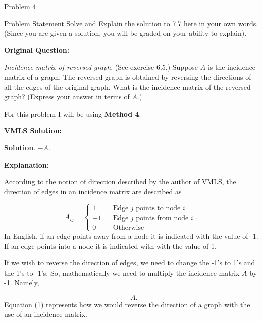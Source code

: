 \begin{problem}{Problem 4}
    \begin{statement}{Problem Statement}
        Solve and Explain the solution to 7.7 here in your own words. (Since you are given a solution, you will be graded on your ability to explain). \vspace*{1em}

        \noindent \textbf{Original Question:} \vspace*{1em}

        \textit{Incidence matrix of reversed graph}. (See exercise 6.5.) Suppose $A$ is the incidence matrix of a graph. The reversed graph is obtained by reversing the directions of all the edges of the 
        original graph. What is the incidence matrix of the reversed graph? (Express your answer in terms of $A$.)
    \end{statement}

    \begin{Highlight}[Solution]
        For this problem I will be using \textbf{Method 4}. \vspace*{1em}

        \noindent \textbf{VMLS Solution:} \vspace*{1em}

        \textbf{Solution}. $-A$. \vspace*{1em}

        \noindent \textbf{Explanation:} \vspace*{1em}

        According to the notion of direction described by the author of VMLS, the direction of edges in an incidence matrix are described as

        \begin{equation*}
            A_{ij} = \left\{
                \begin{aligned}
                    1 & & \text{Edge $j$ points to node $i$} \\
                    -1 & & \text{Edge $j$ points from node $i$} \\
                    0 & & \text{Otherwise}
                \end{aligned}
            \right. .
        \end{equation*}
        In English, if an edge points away from a node it is indicated with the value of -1. If an edge points into a node it is indicated with with the value of 1.

        If we wish to reverse the direction of edges, we need to change the -1's to 1's and the 1's to -1's. So, mathematically we need to multiply the incidence matrix $A$ by -1. Namely,

        \setcounter{equation}{0}
        \begin{equation}
            -A.
        \end{equation}
        Equation (1) represents how we would reverse the direction of a graph with the use of an incidence matrix.
    \end{Highlight}
\end{problem}

